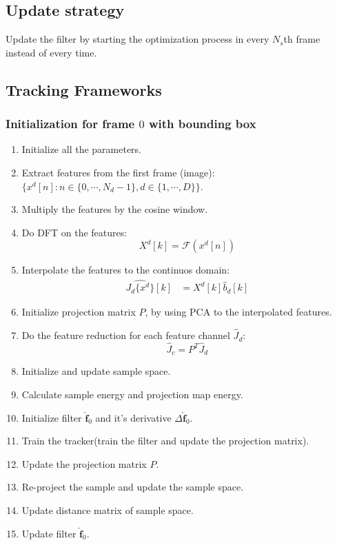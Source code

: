 \documentclass[12pt]{article}
\numberwithin{equation}{section}
\begin{document}
{\subsection{Update strategy}
Update the filter by starting the optimization process in every $N_s$th frame instead of every time.
\subsection{Tracking Frameworks}
\subsubsection{Initialization for frame $0$ with bounding box}
\begin{enumerate}
	\item Initialize all the parameters.
	\item Extract features from the first frame (image):$\{x^d[n]: n \in \{0, \cdots, N_d -1\}, d \in \{1, \cdots, D\}\}$.
	\item Multiply the features by the cosine window.
	\item Do DFT on the features:
		\begin{equation} 
			X^d[k] = \mathcal{F} (x^d[n])
		\end{equation} \par
	\item Interpolate the features to the continuos domain:
		\begin{align}
			\widehat{J_d\{x^d\}}[k]&=X^d[k] \hat{b}_d[k] 
		\end{align} \par 
	\item Initialize projection matrix $P$, by using PCA to the interpolated features.
	\item Do the feature reduction for each feature channel $\hat{J}_d$:
	\begin{equation}
		\hat{J}_c = P^T\hat{J}_d
	\end{equation} 
	\item Initialize and update sample space.
	\item Calculate sample energy and projection map energy.
	\item Initialize filter $\hat{\bm{f}}_{0}$ and it's derivative $\Delta \hat{\bm{f}}_{0}$.
	\item Train the tracker(train the filter and update the projection matrix).
	\item Update the projection matrix $P$.
	\item Re-project the sample and update the sample space.
	\item Update distance matrix of sample space.
	\item Update filter  $\hat{\bm{f}}_{0}$.
\end{enumerate}
}
\end{document}
